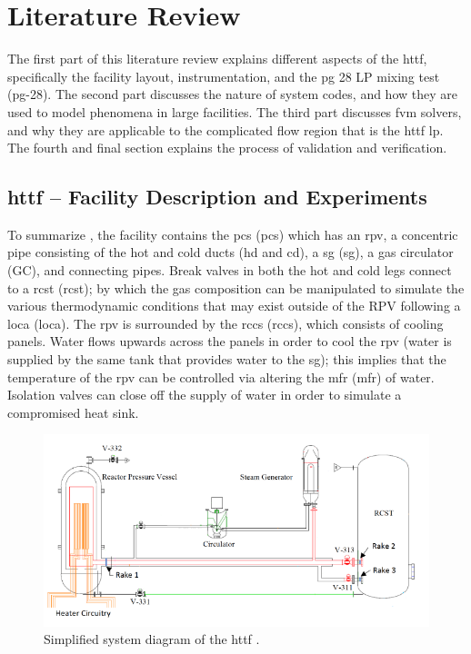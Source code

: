 \documentclass[double,12pt]{beavtex}
\begin{document}

\chapter{Literature Review}

The first part of this literature review explains different aspects of the \acrshort{httf}, specifically the facility layout, instrumentation, and the  \acrlong{pg} 28 LP mixing test (\acrshort{pg}-28). The second part discusses the nature of system codes, and how they are used to model phenomena in large facilities. The third part discusses \acrshort{fvm} solvers, and why they are applicable to the complicated flow region that is the \acrshort{httf} \acrshort{lp}. The fourth and final section explains the process of validation and verification. 

\section{\acrshort{httf} – Facility Description and Experiments}

To summarize \cite{woods}, the facility contains the \acrlong{pcs} (\acrshort{pcs}) which has an \acrshort{rpv}, a concentric pipe consisting of the hot and cold ducts (\acrshort{hd} and \acrshort{cd}), a \acrlong{sg} (\acrshort{sg}), a gas circulator (GC), and connecting pipes. Break valves in both the hot and cold legs connect to a \acrlong{rcst} (\acrshort{rcst}); by which the gas composition can be manipulated to simulate the various thermodynamic conditions that may exist outside of the RPV following a \acrlong{loca} (\acrshort{loca}). The \acrshort{rpv} is surrounded by the \acrlong{rccs} (\acrshort{rccs}), which consists of cooling panels. Water flows upwards across the panels in order to cool the \acrshort{rpv} (water is supplied by the same tank that provides water to the \acrshort{sg}); this implies that the temperature of the \acrshort{rpv} can be controlled via altering the \acrlong{mfr} (\acrshort{mfr}) of water. Isolation valves can close off the supply of water in order to simulate a compromised heat sink. 

\begin{figure}
    \begin{center}
    	\includegraphics[width=12cm]{Figures/HTTF_Simple_Facility_Diagram.png}
    	\caption{Simplified system diagram of the \acrshort{httf} \cite{brumback_2020}.}
    	\label{fig:HTTF_Facility_Schematic}
    	\end{center}
\end{figure}
\end{document}

